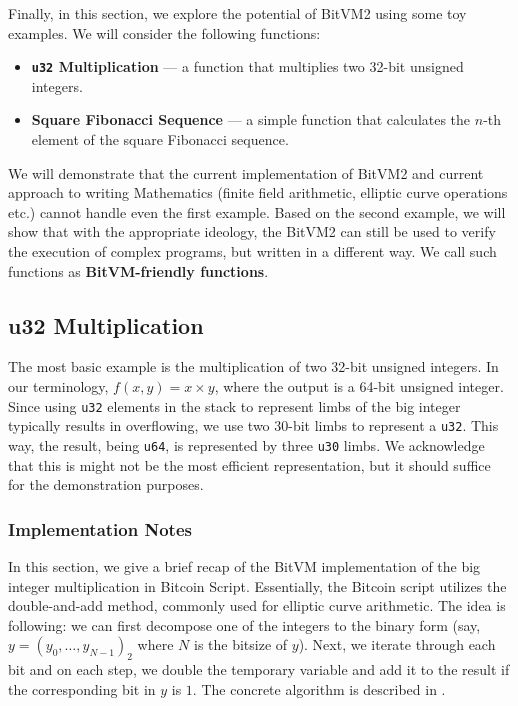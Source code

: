 \documentclass{iacrtrans}
\begin{document}
Finally, in this section, we explore the potential of BitVM2 using some toy
examples. We will consider the following functions:
\begin{itemize}
  \item \textbf{\texttt{u32} Multiplication} --- a function that
    multiplies two 32-bit unsigned integers.
  \item \textbf{Square Fibonacci Sequence} --- a simple function that
    calculates the $n$-th element of the square Fibonacci sequence.
\end{itemize}

We will demonstrate that the current implementation of BitVM2 and current
approach to writing Mathematics (finite field arithmetic, elliptic curve
operations etc.) cannot handle even the first example. Based on the second
example, we will show that with the appropriate ideology, the BitVM2 can still
be used to verify the execution of complex programs, but written in a different
way. We call such functions as \textbf{BitVM-friendly functions}.
\subsection{u32 Multiplication}

The most basic example is the multiplication of two 32-bit unsigned integers. In
our terminology, $f(x,y) = x \times y$, where the output is a 64-bit unsigned
integer. Since using \texttt{u32} elements in the stack to represent limbs of
the big integer typically results in overflowing, we use two $30$-bit limbs to
represent a \texttt{u32}. This way, the result, being \texttt{u64}, is
represented by three \texttt{u30} limbs. We acknowledge that this is might not
be the most efficient representation, but it should suffice for the
demonstration purposes.

\subsubsection{Implementation Notes}

In this section, we give a brief recap of the BitVM implementation of the big
integer multiplication in Bitcoin Script. Essentially, the Bitcoin script
utilizes the double-and-add method, commonly used for elliptic curve arithmetic.
The idea is following: we can first decompose one of the integers to the binary
form (say, $y=(y_0,\dots,y_{N-1})_2$ where $N$ is the bitsize of $y$). Next, we
iterate through each bit and on each step, we double the temporary variable and
add it to the result if the corresponding bit in $y$ is $1$. The concrete
algorithm is described in .
\end{document}

